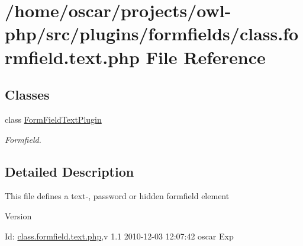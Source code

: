 \section{/home/oscar/projects/owl-\/php/src/plugins/formfields/class.formfield.text.php File Reference}
\label{class_8formfield_8text_8php}
\subsection*{Classes}
\begin{DoxyCompactItemize}
\item 
class \hyperlink{classFormFieldTextPlugin}{FormFieldTextPlugin}
\begin{DoxyCompactList}\small\item\em Formfield. \item\end{DoxyCompactList}\end{DoxyCompactItemize}


\subsection{Detailed Description}
This file defines a text-\/, password or hidden formfield element \begin{DoxyVersion}{Version}

\end{DoxyVersion}
\begin{DoxyParagraph}{Id:}
\hyperlink{class_8formfield_8text_8php}{class.formfield.text.php},v 1.1 2010-\/12-\/03 12:07:42 oscar Exp 
\end{DoxyParagraph}
